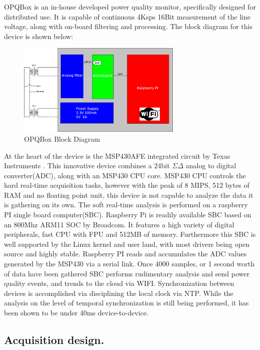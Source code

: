 OPQBox is an in-house developed power quality monitor, specifically designed for distributed use. It is capable of continuous  4Ksps 16Bit measurement of the line voltage, along with
on-board filtering and processing. The block diagram for this device is shown below:

\begin{figure}[h!]
\centering
\includegraphics[width=0.7\textwidth]{img/OHM1Block.eps}
\caption{OPQBox Block Diagram}
\end{figure}

At the heart of the device is the MSP430AFE integrated circuit by Texas Instruments \textregistered. This innovative device combines a 24bit $\Sigma\Delta$ analog to digital converter(ADC), along with an MSP430 CPU core. MSP430 CPU controls the hard real-time acquisition tasks, however with the peak of 8 MIPS, 512 bytes of RAM and no floating point unit, this device is not capable to analyze the data it is gathering on its own. The soft real-time analysis is performed on a raspberry PI single board computer(SBC). Raspberry Pi is readily available SBC based on an 800Mhz ARM11 SOC by Broadcom\textregistered. It features a high variety of digital peripherals, fast CPU with FPU and 512MB of memory. Furthermore this SBC is well supported by the Linux kernel and user land, with most drivers being open source and highly stable. Raspberry PI reads and accumulates the ADC values generated by the MSP430 via a serial link. Once 4000 samples, or 1 second worth of data have been gathered SBC performs rudimentary analysis and send power quality events, and trends to the cloud via WIFI. Synchronization between devices is accomplished via disciplining the local clock via NTP. While the analysis on the level of temporal synchronization is still being performed, it has been shown to be under 40ms device-to-device.

\subsection{Acquisition design.}

